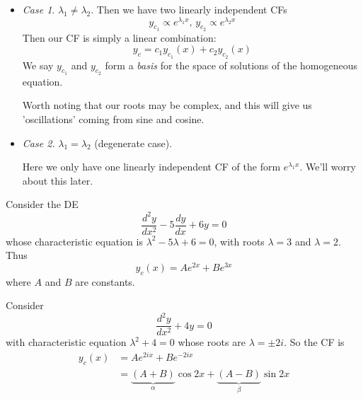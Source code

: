 \documentclass{../template/note}
\begin{document}
    \begin{itemize}
        \item \emph{Case 1}. \(\lambda_1 \neq \lambda_2\). Then we have two linearly independent CFs
        \[
            y_{c_1} \propto e^{\lambda_1 x}, \, y_{c_2} \propto e^{\lambda_2 x}
        \]
        Then our CF is simply a linear combination:
        \[
            y_c = c_1 y_{c_1}(x) + c_2 y_{c_2} (x)
        \]
        We say \(y_{c_1}\) and \(y_{c_2}\) form a \emph{basis} for the space of solutions of the homogeneous equation.

        Worth noting that our roots may be complex, and this will give us 'oscillations' coming from sine and cosine.

        \item \emph{Case 2.} \(\lambda_1 = \lambda_2\) (degenerate case).
        
        Here we only have one linearly independent CF of the form \(e^{\lambda_1 x}\). We'll worry about this later.
    \end{itemize}
    
    \begin{example}
        Consider the DE
        \[
            \frac{d^2y}{dx^2} - 5\frac{dy}{dx} + 6y = 0
        \]    
        whose characteristic equation is \(\lambda^2 - 5\lambda + 6 = 0\), with roots \(\lambda = 3\) and \(\lambda = 2\). Thus
        \[
            y_c(x) = Ae^{2x} + Be^{3x}
        \]    
        where \(A\) and \(B\) are constants.
    \end{example}
    
    \begin{example}
        Consider
        \[
            \frac{d^2y}{dx^2} + 4y = 0
        \]
        with characteristic equation \(\lambda^2 + 4 = 0\) whose roots are \(\lambda = \pm 2i\). So the CF is
        \begin{align*}
            y_c(x) &= Ae^{2ix} + Be^{-2ix} \\
            &= \underbrace{(A+B)}_\alpha \cos 2x + \underbrace{(A-B)}_\beta \sin 2x
        \end{align*}
    \end{example}
\end{document}
